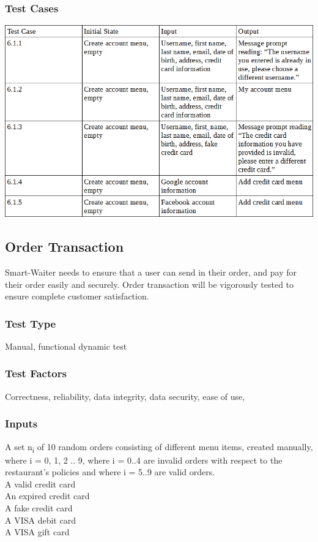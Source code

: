 \documentclass[12pt]{article}
\begin{document}
\subsubsection{Test Cases}
\includegraphics[width=\textwidth,height=\textheight,keepaspectratio]{accountTC.png}


\subsection{Order Transaction}
Smart-Waiter needs to ensure that a user can send in their order, and pay for their order easily and securely. Order transaction will be vigorously tested to ensure complete customer satisfaction.  
\subsubsection{Test Type}
Manual, functional dynamic test 
\subsubsection{Test Factors}
Correctness, reliability, data integrity, data security, ease of use, 
\subsubsection{Inputs}
A set \texorpdfstring{n\textsubscript{i}}{ni} of 10 random orders consisting of different menu items, created manually, where i = 0, 1, 2 .. 9, where i = 0..4 are invalid orders with respect to the restaurant's policies and where i = 5..9 are valid orders. \\
A valid credit card \\
An expired credit card \\
A fake credit card \\
A VISA debit card \\
A VISA gift card \\
\end{document}

